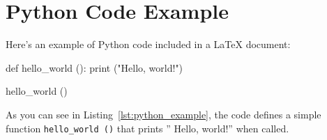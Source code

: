 \documentclass{article}
\begin{document}
\section{Python Code Example}

Here's an example of Python code included in a LaTeX document:

\begin{python}[caption=My Python code,label=lst:python_example]
def hello_world ():
    print ("Hello, world!")
    
hello_world ()
\end{python}

As you can see in Listing~\ref{lst:python_example}, the code defines a simple function \texttt{hello\_world ()} that prints '' Hello, world!'' when called.
\end{document}
